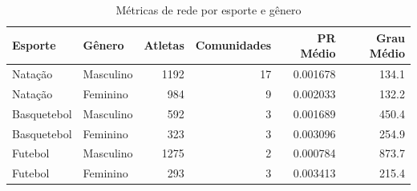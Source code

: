 \begin{table}[htbp]
\caption{Métricas de rede por esporte e gênero}
\label{tab:network_metrics}
\centering
\small
\begin{tabular}{llrrrr}
\toprule
\textbf{Esporte} & \textbf{Gênero} & \textbf{Atletas} & \textbf{Comunidades} & \textbf{PR Médio} & \textbf{Grau Médio} \\
\midrule
Natação & Masculino & 1192 & 17 & 0.001678 & 134.1 \\
Natação & Feminino & 984 & 9 & 0.002033 & 132.2 \\
Basquetebol & Masculino & 592 & 3 & 0.001689 & 450.4 \\
Basquetebol & Feminino & 323 & 3 & 0.003096 & 254.9 \\
Futebol & Masculino & 1275 & 2 & 0.000784 & 873.7 \\
Futebol & Feminino & 293 & 3 & 0.003413 & 215.4 \\
\bottomrule
\end{tabular}
\end{table}
